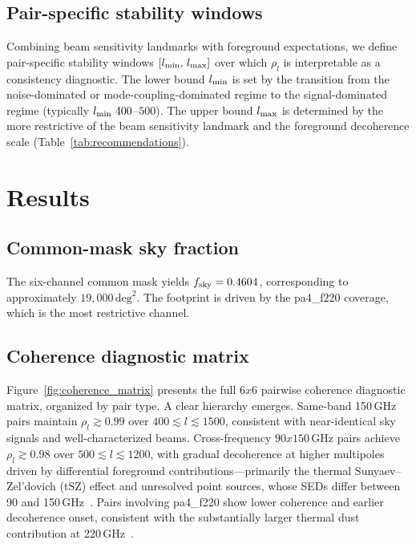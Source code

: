 \documentclass[twocolumn,showpacs,preprintnumbers,amsmath,amssymb,floatfix,prd]{revtex4-2}
\def\ell{l}%
\def\sim{~}%
\def\times{x}%
\begin{document}
\subsection{Pair-specific stability windows}\label{sec:windows}

Combining beam sensitivity landmarks with foreground expectations, we
define pair-specific stability windows $[\ell_{\rm min},\,\ell_{\rm max}]$
over which $\rho_\ell$ is interpretable as a consistency diagnostic.  The
lower bound $\ell_{\rm min}$ is set by the transition from the
noise-dominated or mode-coupling-dominated regime to the signal-dominated
regime (typically $\ell_{\rm min}\sim400$--$500$).  The upper bound
$\ell_{\rm max}$ is determined by the more restrictive of the beam
sensitivity landmark and the foreground decoherence scale
(Table~\ref{tab:recommendations}).

\section{Results}\label{sec:results}

\subsection{Common-mask sky fraction}\label{sec:fsky}

The six-channel common mask yields $f_{\rm sky}=0.4604$, corresponding
to approximately $19{,}000\,\mathrm{deg}^2$.  The footprint is driven by
the pa4\_f220 coverage, which is the most restrictive channel.

\subsection{Coherence diagnostic matrix}\label{sec:matrix}

Figure~\ref{fig:coherence_matrix} presents the full $6\times6$ pairwise
coherence diagnostic matrix, organized by pair type.  A clear hierarchy
emerges.  Same-band 150\,GHz pairs maintain $\rho_\ell\gtrsim0.99$ over
$400\lesssim\ell\lesssim1500$, consistent with near-identical sky signals
and well-characterized beams.  Cross-frequency $90\times150$\,GHz pairs
achieve $\rho_\ell\gtrsim0.98$ over $500\lesssim\ell\lesssim1200$, with
gradual decoherence at higher multipoles driven by differential foreground
contributions---primarily the thermal Sunyaev--Zel'dovich (tSZ) effect and
unresolved point sources, whose SEDs differ between 90 and
150\,GHz~\cite{Dunkley2011,Reichardt2021}.  Pairs involving pa4\_f220
show lower coherence and earlier decoherence onset, consistent with the
substantially larger thermal dust contribution at
220\,GHz~\cite{Planck2020IV}.
\end{document}
